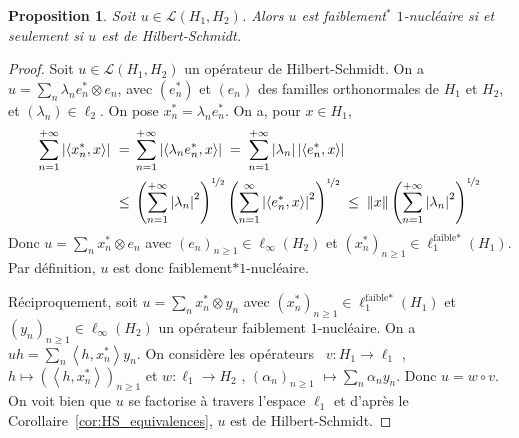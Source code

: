 \documentclass{smfart}
\theoremstyle{plain}
\newtheorem{proposition}[theorem]{Proposition}
\theoremstyle{definition}
\newcommand {\FAIBLE} {\text{faible}}
\newcommand{\demi}{{\nicefrac{1}{2}}}
\begin{document}
\begin{proposition}\label{prop:faiblement-1-nuc-equals-HS}
  Soit $u\in\mathcal{L}\left(H_1,H_2\right)$. Alors $u$ est faiblement${}^\ast$ $1$-nucléaire si et seulement si $u$ est de Hilbert-Schmidt.
\end{proposition}
\begin{proof}
  Soit $u \in\mathcal{L}\left(H_1,H_2\right)$ un opérateur de
  Hilbert-Schmidt. On a $u=\sum_n \lambda_n e_n^*{\otimes} e_n$, avec
  $(e_n^*)$ et $(e_n)$ des familles orthonormales de $H_1$ et $H_2$,
  et $(\lambda_n) \in \ell_2$. On pose $x_n^*=\lambda_n e_n^*$. On a,
  pour $x \in H_1$,
\begin{align*}
\sum_{n=1}^{+\infty}\left|\left\langle x_n^*,x\right\rangle\right|\
=& \; \sum_{n=1}^{+\infty}\left|\left\langle \lambda_n e_n^*,x\right\rangle\right|
\; =  \; \sum_{n=1}^{+\infty}\left|\lambda_n\right|\left|\left\langle e_n^*,x\right\rangle\right|\\
\leq& \; \left(\sum_{n=1}^{+\infty}\left|\lambda_n\right|^2\right)^{\demi}\left(\sum_{n=1}^\infty\left|\left\langle e_n^*,x\right\rangle\right|^2\right)^{\demi}
\; \leq \; \left\|x\right\|\left(\sum_{n=1}^{+\infty}\left|\lambda_n\right|^2\right)^{\demi}
\end{align*}
Donc $u=\sum _n x_n^*{\otimes} e_n$ avec $(e_n)_{n\ge
  1}\in\ell_\infty(H_2)$ et $(x_n^*)_{n\ge
  1}\in\ell_1^{\FAIBLE\ast}(H_1)$. Par définition, $u $ est donc faiblement$\ast
1$-nucléaire.

\smallskip

\noindent Réciproquement, soit $u=\sum_n x_n^* {\otimes} y_n$ avec
$(x_n^*)_{n\ge 1} \in \ell_1^{\FAIBLE\ast}(H_1)$ et $(y_n)_{n\ge 1}
\in \ell_{\infty}(H_2)$ un opérateur faiblement $1$-nucléaire. On a $u
h =\sum _n \left\langle h ,x_n^*\right\rangle y_n$.  On considère les
opérateurs \ $ v : H_1\rightarrow \ell_1$ , $h\longmapsto
(\left\langle h, x_n^*\right\rangle)_{n\ge 1}$ et $w
:\ell_1\rightarrow H_2$ , $(\alpha_n)_{n\ge 1}$ $\longmapsto \sum _n
\alpha_n y_n$. Donc $u=w\circ v$. On voit bien que $u$ se factorise à
travers l'espace $\ell_1$ et d'après le
Corollaire~\ref{cor:HS_equivalences}, $u$ est de Hilbert-Schmidt.
\end{proof}
\end{document}
